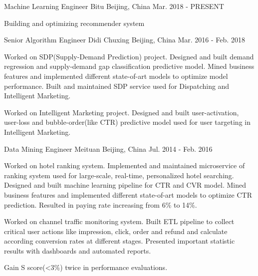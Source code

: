 

\begin{cventries}

  \cventry
    {Machine Learning Engineer}
    {Bitu}
    {Beijing, China}
    {Mar. 2018 - PRESENT}
    {
      \begin{cvitems}
        \item {Building and optimizing recommender system}
      \end{cvitems}
    }

  \cventry
    {Senior Algorithm Engineer}
    {Didi Chuxing}
    {Beijing, China}
    {Mar. 2016 - Feb. 2018}
    {
      \begin{cvitems}
        \item {Worked on SDP(Supply-Demand Prediction) project. Designed and built demand regression and supply-demand gap classification predictive
model. Mined business features and implemented different state-of-art models to optimize model performance. Built and maintained SDP
service used for Dispatching and Intelligent Marketing.}
        \item {Worked on Intelligent Marketing project. Designed and built user-activation, user-loss and bubble-order(like CTR) predictive model used for
user targeting in Intelligent Marketing.}
      \end{cvitems}
    }

  \cventry
    {Data Mining Engineer}
    {Meituan}
    {Beijing, China}
    {Jul. 2014 - Feb. 2016}
    {
      \begin{cvitems}
        \item {Worked on hotel ranking system. Implemented and maintained microservice of ranking system used for large-scale, real-time, personalized
hotel searching. Designed and built machine learning pipeline for CTR and CVR model. Mined business features and implemented different
state-of-art models to optimize CTR prediction. Resulted in paying rate increasing from 6\% to 14\%.}
        \item {Worked on channel traffic monitoring system. Built ETL pipeline to collect critical user actions like impression, click, order and refund and
calculate according conversion rates at different stages. Presented important statistic results with dashboards and automated reports.}
        \item {Gain S score(<3\%) twice in performance evaluations.}
      \end{cvitems}
    }


\end{cventries}
